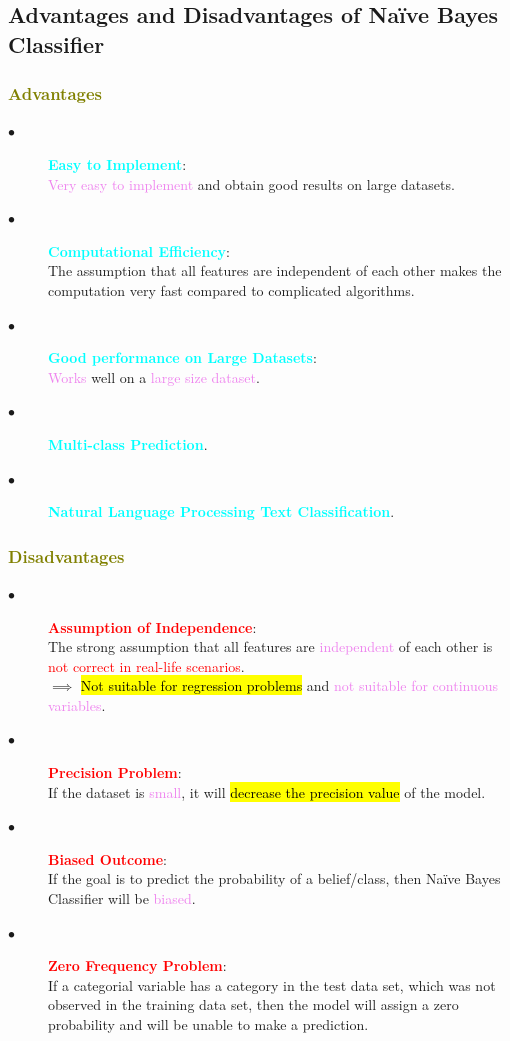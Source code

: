 \documentclass{book}
\begin{document}
\subsection{Advantages and Disadvantages of Naïve Bayes Classifier}
\textcolor{olive}{\subsubsection{Advantages}}
\begin{description}
    \item[$\bullet$] \textcolor{cyan}{\textbf{Easy to Implement}}:\\
    \textcolor{violet}{Very easy to implement} and obtain good results on large datasets.
    \item[$\bullet$] \textcolor{cyan}{\textbf{Computational Efficiency}}:\\
    The assumption that all features are independent of each other makes the computation very fast compared to complicated algorithms.
    \item[$\bullet$] \textcolor{cyan}{\textbf{Good performance on Large Datasets}}:\\
    \textcolor{violet}{Works} well on a \textcolor{violet}{large size dataset}.
    \item[$\bullet$] \textcolor{cyan}{\textbf{Multi-class Prediction}}.
    \item[$\bullet$] \textcolor{cyan}{\textbf{Natural Language Processing Text Classification}}.
\end{description}
\textcolor{olive}{\subsubsection{Disadvantages}}
\begin{description}
    \item[$\bullet$] \textcolor{red}{\textbf{Assumption of Independence}}:\\
    The strong assumption that all features are \textcolor{violet}{independent} of each other is \textcolor{red}{not correct in real-life scenarios}.\\
    $\implies$ \hl{Not suitable for regression problems} and \textcolor{violet}{not suitable for continuous variables}.
    \item[$\bullet$] \textcolor{red}{\textbf{Precision Problem}}:\\
    If the dataset is \textcolor{violet}{small}, it will \hl{decrease the precision value} of the model.
    \item[$\bullet$] \textcolor{red}{\textbf{Biased Outcome}}:\\
    If the goal is to predict the probability of a belief/class, then Naïve Bayes Classifier will be \textcolor{violet}{biased}.
    \item[$\bullet$] \textcolor{red}{\textbf{Zero Frequency Problem}}:\\
    If a categorial variable has a category in the test data set, which was not observed in the training data set, then the model will assign a zero probability and will be unable to make a prediction.
\end{description}
\end{document}
